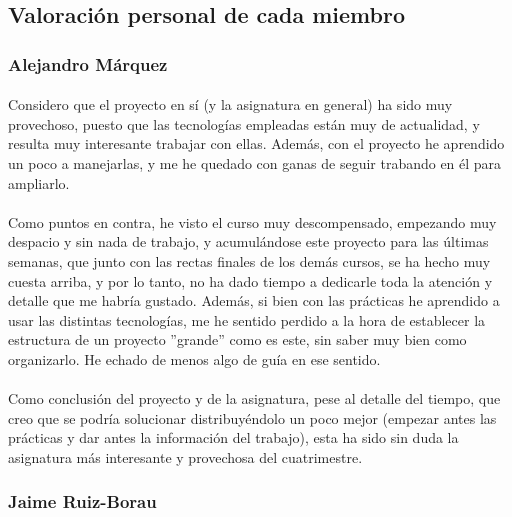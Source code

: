 \documentclass[a4paper]{article}
\begin{document}
	\subsection{Valoración personal de cada miembro}
	
	
		\subsubsection{Alejandro Márquez}
		
			\paragraph{}Considero que el proyecto en sí (y la asignatura en general) ha sido muy provechoso, puesto que las tecnologías empleadas están muy de actualidad, y resulta muy interesante trabajar con ellas. Además, con el proyecto he aprendido un poco a manejarlas, y me he quedado con ganas de seguir trabando en él para ampliarlo.

			\paragraph{}Como puntos en contra, he visto el curso muy descompensado, empezando muy despacio y sin nada de trabajo, y acumulándose este proyecto para las últimas semanas, que junto con las rectas finales de los demás cursos, se ha hecho muy cuesta arriba, y por lo tanto, no ha dado tiempo a dedicarle toda la atención y detalle que me habría gustado. Además, si bien con las prácticas he aprendido a usar las distintas tecnologías, me he sentido perdido a la hora de establecer la estructura de un proyecto ''grande'' como es este, sin saber muy bien como organizarlo. He echado de menos algo de guía en ese sentido.

			\paragraph{}Como conclusión del proyecto y de la asignatura, pese al detalle del tiempo, que creo que se podría solucionar distribuyéndolo un poco mejor (empezar antes las prácticas y dar antes la información del trabajo), esta ha sido sin duda la asignatura más interesante y provechosa del cuatrimestre.
		
		\subsubsection{Jaime Ruiz-Borau}
			
\end{document}
